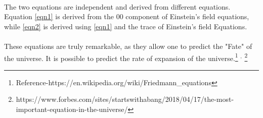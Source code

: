 \paragraph{}
The two equations are independent and derived from different equations.
Equation \ref{eqn1} is derived from the 00 component of Einstein's field equations, while \ref{eqn2} is derived using \ref{eqn1} and the trace of Einstein's field Equations.
\paragraph{}
These equations are truly remarkable, as they allow one to predict the "Fate" of the universe. It is possible to predict the rate of expansion of the universe.\footnote{Reference-https://en.wikipedia.org/wiki/Friedmann\_equations}
$^{,}$
\footnote{https://www.forbes.com/sites/startswithabang/2018/04/17/the-most-important-equation-in-the-universe/}

%
